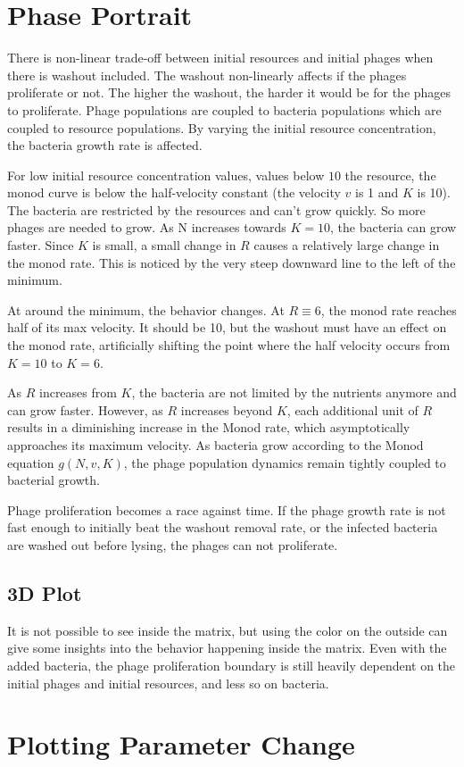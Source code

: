\section{Phase Portrait}
There is non-linear trade-off between initial resources and initial phages when there is washout included. 
The washout non-linearly affects if the phages proliferate or not. 
The higher the washout, the harder it would be for the phages to proliferate. 
Phage populations are coupled to bacteria populations which are coupled to resource populations. 
By varying the initial resource concentration, the bacteria growth rate is affected. 

For low initial resource concentration values, values below $10$ the resource, the monod curve is below the half-velocity constant (the velocity $v$ is 1 and $K$ is 10). 
The bacteria are restricted by the resources and can't grow quickly. 
So more phages are needed to grow. 
As N increases towards $K=10$, the bacteria can grow faster. 
Since $K$ is small, a small change in $R$ causes a relatively large change in the monod rate. 
This is noticed by the very steep downward line to the left of the minimum. 

At around the minimum, the behavior changes. 
At $R\equiv 6$, the monod rate reaches half of its max velocity. 
It should be 10, but the washout must have an effect on the monod rate, artificially shifting the point where the half velocity occurs from $K=10$ to $K=6$. 

As $R$ increases from $K$, the bacteria are not limited by the nutrients anymore and can grow faster. 
However, as $R$ increases beyond $K$, each additional unit of $R$ results in a diminishing increase in the Monod rate, which asymptotically approaches its maximum velocity. 
As bacteria grow according to the Monod equation $g(N, v, K)$, the phage population dynamics remain tightly coupled to bacterial growth. 

Phage proliferation becomes a race against time. 
If the phage growth rate is not fast enough to initially beat the washout removal rate, or the infected bacteria are washed out before lysing, the phages can not proliferate. 

\subsection{3D Plot}
It is not possible to see inside the matrix, but using the color on the outside can give some insights into the behavior happening inside the matrix. 
Even with the added bacteria, the phage proliferation boundary is still heavily dependent on the initial phages and initial resources, and less so on bacteria. 


\section{Plotting Parameter Change}
